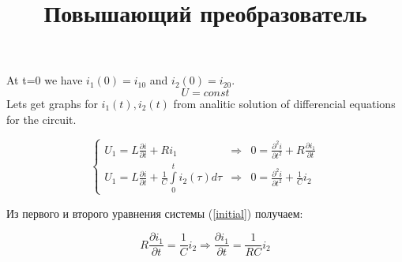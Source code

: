 \documentclass[a4paper,12pt]{article}
\title{Повышающий преобразователь}
\author{}
\begin{document}





At t=0 we have $i_1(0) = i_{10}$ and $i_2(0) = i_{20}$.
$$
U=const
$$
Lets get graphs for $i_1(t), i_2(t)$ from analitic solution of differencial equations for the circuit.

\begin{equation}
\left\{
\begin{array}{lll}
U_1 = L\frac{\partial i}{\partial t} + R i_1 & \Rightarrow & 0 = \frac{\partial^2 i}{\partial t^2} + R \frac{\partial i_1}{\partial t} \\
	U_1 = L\frac{\partial i}{\partial t} + \frac{1}{C}\int\limits_0^t i_2(\tau) d\tau & \Rightarrow & 0 = \frac{\partial^2 i}{\partial t^2} + \frac{1}{C} i_2
\end{array}
\right.
\label{initial}
\end{equation}

Из первого и второго уравнения системы (\ref{initial}) получаем:

\begin{equation}
R\frac{\partial i_1}{\partial t} = \frac{1}{C} i_2 \Rightarrow \frac{\partial i_1}{\partial t} = \frac{1}{RC} i_2 
\label{first}
\end{equation}
\end{document}

